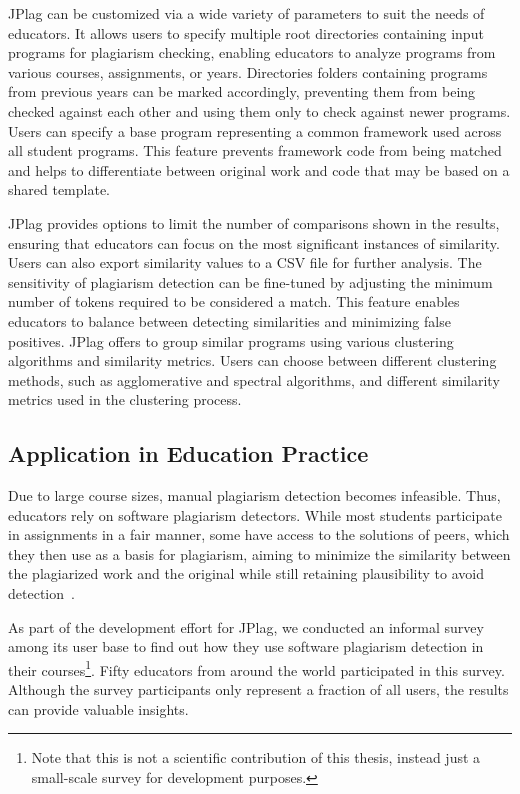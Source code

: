 JPlag can be customized via a wide variety of parameters to suit the needs of educators.
It allows users to specify multiple root directories containing input programs for plagiarism checking, enabling educators to analyze programs from various courses, assignments, or years. Directories folders containing programs from previous years can be marked accordingly, preventing them from being checked against each other and using them only to check against newer programs. Users can specify a base program representing a common framework used across all student programs. This feature prevents framework code from being matched and helps to differentiate between original work and code that may be based on a shared template.

JPlag provides options to limit the number of comparisons shown in the results, ensuring that educators can focus on the most significant instances of similarity. Users can also export similarity values to a CSV file for further analysis. The sensitivity of plagiarism detection can be fine-tuned by adjusting the minimum number of tokens required to be considered a match. This feature enables educators to balance between detecting similarities and minimizing false positives.
%
JPlag offers to group similar programs using various clustering algorithms and similarity metrics. Users can choose between different clustering methods, such as agglomerative and spectral algorithms, and different similarity metrics used in the clustering process.

\subsection{Application in Education Practice}\label{sec:survey}
Due to large course sizes, manual plagiarism detection becomes infeasible. Thus, educators rely on software plagiarism detectors. While most students participate in assignments in a fair manner, some have access to the solutions of peers, which they then use as a basis for plagiarism, aiming to minimize the similarity between the plagiarized work and the original while still retaining plausibility to avoid detection~\cite{DevoreMcDonald2020}.

As part of the development effort for JPlag, we conducted an informal survey~\cite{JPlagSurvey2024} among its user base to find out how they use software plagiarism detection in their courses\footnote{Note that this is not a scientific contribution of this thesis, instead just a small-scale survey for development purposes.}. Fifty educators from around the world participated in this survey.
Although the survey participants only represent a fraction of all users, the results can provide valuable insights.

